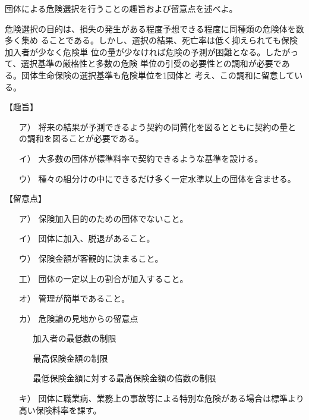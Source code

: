 \documentclass[report,gutter=10mm,fore-edge=10mm,uplatex,dvipdfmx]{jlreq}
\begin{document}
団体による危険選択を行うことの趣旨および留意点を述べよ。
\answer{}

危険選択の目的は、損失の発生がある程度予想できる程度に同種類の危険体を数多く集め
ることである。しかし、選択の結果、死亡率は低く抑えられても保険加入者が少なく危険単
位の量が少なければ危険の予測が困難となる。したがって、選択基準の厳格性と多数の危険
単位の引受の必要性との調和が必要である。団体生命保険の選択基準も危険単位を1団体と
考え、この調和に留意している。

【趣旨】

\begin{itemize}
\item[ ア）] 将来の結果が予測できるよう契約の同質化を図るとともに契約の量との調和を図ることが必要である。
\item[ イ）] 大多数の団体が標準料率で契約できるような基準を設ける。
\item[ ウ）] 種々の組分けの中にできるだけ多く一定水準以上の団体を含ませる。
\end{itemize}

【留意点】

\begin{itemize}
\item[ ア）] 保険加入目的のための団体でないこと。
\item[ イ）] 団体に加入、脱退があること。
\item[ ウ）] 保険金額が客観的に決まること。
\item[ 工）] 団体の一定以上の割合が加入すること。
\item[ オ）] 管理が簡単であること。
\item[ カ）] 危険論の見地からの留意点
\begin{itemize}
 \item[ ] 加入者の最低数の制限
 \item[ ] 最高保険金額の制限
 \item[ ] 最低保険金額に対する最高保険金額の倍数の制限
\end{itemize}
\item[ キ）] 団体に職業病、業務上の事故等による特別な危険がある場合は標準より高い保険料率を課す。
\end{itemize}
\end{document}
